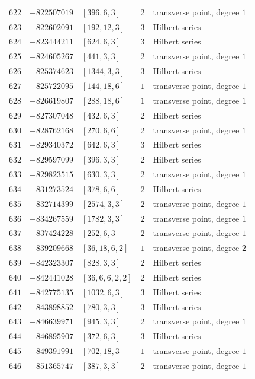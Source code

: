 \documentclass[11pt]{article}
\begin{document}
\begin{center}
\begin{longtable}{r r l c l}
$622$ & $-822507019$ & $[396,6,3]$ & $2$ & transverse point, degree $1$\\
$623$ & $-822602091$ & $[192,12,3]$ & $3$ & Hilbert series\\
$624$ & $-823444211$ & $[624,6,3]$ & $3$ & Hilbert series\\
$625$ & $-824605267$ & $[441,3,3]$ & $2$ & transverse point, degree $1$\\
$626$ & $-825374623$ & $[1344,3,3]$ & $3$ & Hilbert series\\
$627$ & $-825722095$ & $[144,18,6]$ & $1$ & transverse point, degree $1$\\
$628$ & $-826619807$ & $[288,18,6]$ & $1$ & transverse point, degree $1$\\
$629$ & $-827307048$ & $[432,6,3]$ & $2$ & Hilbert series\\
$630$ & $-828762168$ & $[270,6,6]$ & $2$ & transverse point, degree $1$\\
$631$ & $-829340372$ & $[642,6,3]$ & $3$ & Hilbert series\\
$632$ & $-829597099$ & $[396,3,3]$ & $2$ & Hilbert series\\
$633$ & $-829823515$ & $[630,3,3]$ & $2$ & transverse point, degree $1$\\
$634$ & $-831273524$ & $[378,6,6]$ & $2$ & Hilbert series\\
$635$ & $-832714399$ & $[2574,3,3]$ & $2$ & transverse point, degree $1$\\
$636$ & $-834267559$ & $[1782,3,3]$ & $2$ & transverse point, degree $1$\\
$637$ & $-837424228$ & $[252,6,3]$ & $2$ & transverse point, degree $1$\\
$638$ & $-839209668$ & $[36,18,6,2]$ & $1$ & transverse point, degree $2$\\
$639$ & $-842323307$ & $[828,3,3]$ & $2$ & Hilbert series\\
$640$ & $-842441028$ & $[36,6,6,2,2]$ & $2$ & Hilbert series\\
$641$ & $-842775135$ & $[1032,6,3]$ & $3$ & Hilbert series\\
$642$ & $-843898852$ & $[780,3,3]$ & $3$ & Hilbert series\\
$643$ & $-846639971$ & $[945,3,3]$ & $2$ & transverse point, degree $1$\\
$644$ & $-846895907$ & $[372,6,3]$ & $3$ & Hilbert series\\
$645$ & $-849391991$ & $[702,18,3]$ & $1$ & transverse point, degree $1$\\
$646$ & $-851365747$ & $[387,3,3]$ & $2$ & transverse point, degree $1$\\

\end{longtable}
\end{center}
\end{document}
